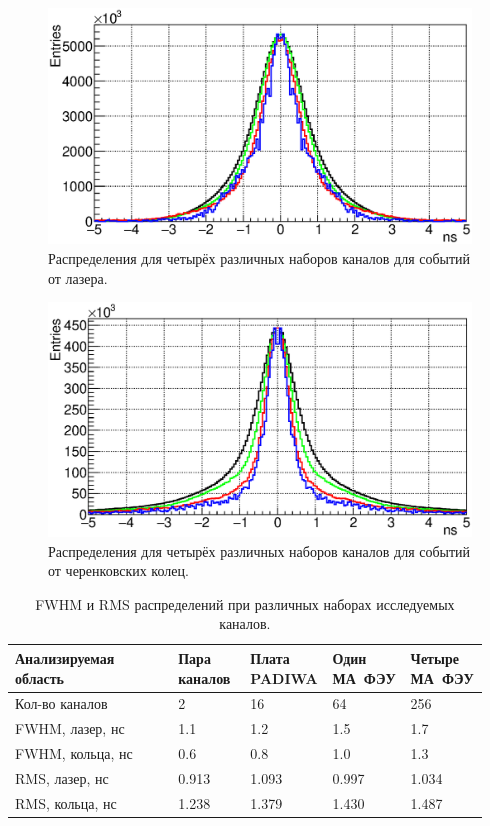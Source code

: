 \begin{figure}[H]
\centering
\includegraphics[width=1.0\textwidth]{pictures/24_TimePrecision_evolution_laser_feb2017.eps}
\caption{Распределения для четырёх различных наборов каналов для событий от лазера.}
\label{fig:TimeResEvolutionLaser}
\end{figure}

\begin{figure}[H]
\centering
\includegraphics[width=1.0\textwidth]{pictures/25_TimePrecision_evolution_rings_feb2017.eps}
\caption{Распределения для четырёх различных наборов каналов для событий от черенковских колец.}
\label{fig:TimeResEvolutionRings}
\end{figure}

\begin{table}[H]
\caption{FWHM и RMS распределений при различных наборах исследуемых каналов.}
\label{tabl:EvolutionParams}
\begin{tabular}{ | p{0.34\linewidth} | p{0.15\linewidth} | p{0.15\linewidth} | p{0.15\linewidth} | p{0.15\linewidth} | }
	\hline
	Анализируемая область & Пара каналов & Плата PADIWA & Один МА~ФЭУ & Четыре МА~ФЭУ \\
	\hline
	Кол-во каналов & 2 & 16 & 64 & 256 \\
	\hline
	FWHM, лазер, нс & 1.1 & 1.2 & 1.5 & 1.7 \\
	\hline
	FWHM, кольца, нс & 0.6 & 0.8 & 1.0 & 1.3 \\
	\hline
	RMS, лазер, нс & 0.913 & 1.093 & 0.997 & 1.034 \\
	\hline
	RMS, кольца, нс & 1.238 & 1.379 & 1.430 & 1.487 \\
	\hline
\end{tabular}
\end{table}
